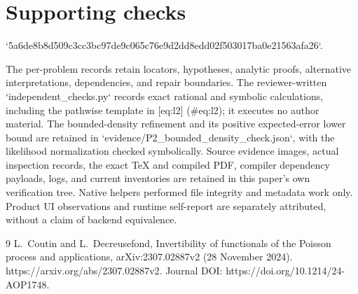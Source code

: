 \documentclass[10pt]{article}
\begin{document}
\section*{Supporting checks}
`5a6de8b8d509c3cc3bc97de9c065c76e9d2dd8edd02f503017ba0e21563afa26`.\par
The per-problem records retain locators, hypotheses, analytic proofs, alternative interpretations, dependencies, and repair boundaries. The reviewer-written `independent\_checks.py` records exact rational and symbolic calculations, including the pathwise template in [eq:l2] (\#eq:l2); it executes no author material. The bounded-density refinement and its positive expected-error lower bound are retained in `evidence/P2\_bounded\_density\_check.json`, with the likelihood normalization checked symbolically. Source evidence images, actual inspection records, the exact TeX and compiled PDF, compiler dependency payloads, logs, and current inventories are retained in this paper’s own verification tree. Native helpers performed file integrity and metadata work only. Product UI observations and runtime self-report are separately attributed, without a claim of backend equivalence.\par
9 L. Coutin and L. Decreusefond, Invertibility of functionals of the Poisson process and applications, arXiv:2307.02887v2 (28 November 2024). https://arxiv.org/abs/2307.02887v2. Journal DOI: https://doi.org/10.1214/24-AOP1748.\par
\end{document}
